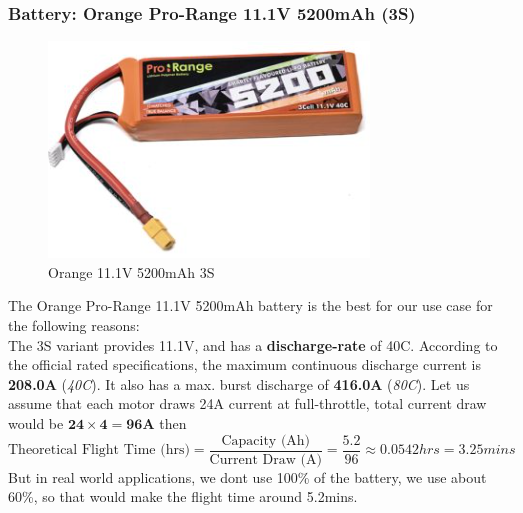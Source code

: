 \documentclass[12pt]{report}
\begin{document}
      \subsubsection{\large Battery: Orange Pro-Range 11.1V 5200mAh (3S)} 
      \begin{figure}
        \includegraphics[width=1\linewidth]{battery.png}
        \caption{Orange 11.1V 5200mAh 3S}
        \label{fig:battery3s}
      \end{figure}
     
      The Orange Pro-Range 11.1V 5200mAh battery is the best for our use case for the following reasons: \\

      The 3S variant provides 11.1V, and has a \textbf{discharge-rate} of 40C. According to the official rated specifications, the maximum continuous discharge current is \textbf{208.0A} (\textit{40C}). It also has a max. burst discharge of \textbf{416.0A} (\textit{80C}). Let us assume that each motor draws 24A current at full-throttle, total current draw would be $ \boldsymbol{24 \times 4 = 96A} $ then \vspace{0.5cm} \[ \text{Theoretical Flight Time (hrs)} = \frac{\text{Capacity (Ah)}}{\text{Current Draw (A)}} = \frac{5.2}{96} \approx 0.0542 hrs = 3.25 mins \] But in real world applications, we dont use 100\% of the battery, we use about 60\%, so that would make the flight time around 5.2mins. 
          
\end{document}
